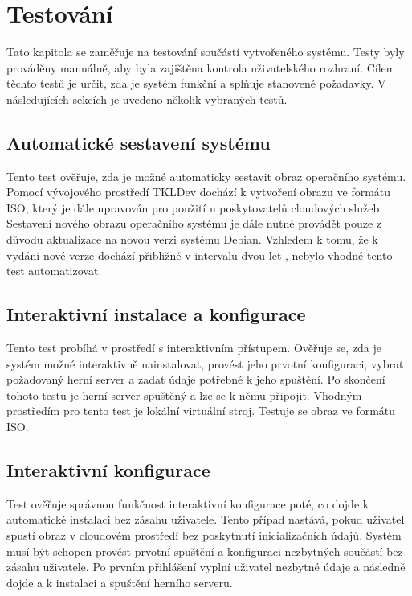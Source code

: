 \chapter{Testování}

Tato kapitola se zaměřuje na testování součástí vytvořeného systému. Testy byly prováděny
manuálně, aby byla zajištěna kontrola uživatelského rozhraní. Cílem těchto testů je určit,
zda je systém funkční a splňuje stanovené požadavky. V následujících sekcích je uvedeno několik
vybraných testů.

\section{Automatické sestavení systému}

Tento test ověřuje, zda je možné automaticky sestavit obraz operačního systému. Pomocí vývojového prostředí
TKLDev dochází k vytvoření obrazu ve formátu ISO, který je dále upravován pro použití u poskytovatelů
cloudových služeb. Sestavení nového obrazu operačního systému je dále nutné provádět pouze z důvodu
aktualizace na novou verzi systému Debian. Vzhledem k tomu, že k vydání nové verze dochází přibližně
v intervalu dvou let \cite{debian_release_stats}, nebylo vhodné tento test automatizovat.

\section{Interaktivní instalace a konfigurace}

Tento test probíhá v prostředí s interaktivním přístupem. Ověřuje se, zda je systém možné interaktivně nainstalovat, provést jeho
prvotní konfiguraci, vybrat požadovaný herní server a zadat údaje potřebné k jeho spuštění. Po skončení tohoto testu
je herní server spuštěný a lze se k němu připojit. Vhodným prostředím pro tento test je lokální virtuální stroj.
Testuje se obraz ve formátu ISO.

\section{Interaktivní konfigurace}

Test ověřuje správnou funkčnost interaktivní konfigurace poté, co dojde k automatické instalaci bez zásahu uživatele.
Tento případ nastává, pokud uživatel spustí obraz v cloudovém prostředí bez poskytnutí inicializačních údajů. Systém
musí být schopen provést prvotní spuštění a konfiguraci nezbytných součástí bez zásahu uživatele.
Po prvním přihlášení vyplní uživatel nezbytné údaje a následně dojde a k instalaci a spuštění herního serveru.

